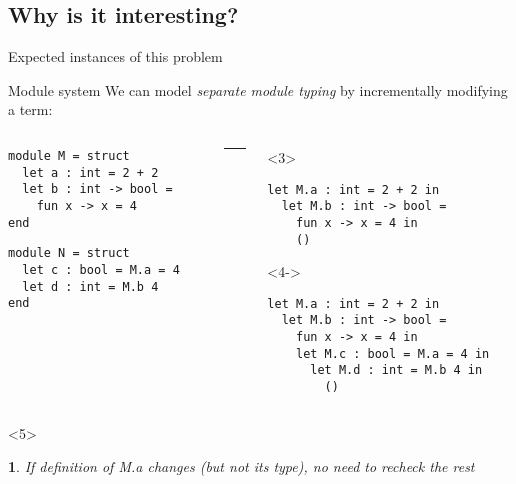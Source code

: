 \documentclass{beamer}
\theoremstyle{example}
\newtheorem{remark}[theorem]{\translate{Remark}}
\begin{document}
\subsection{Why is it interesting?}

\begin{frame}[fragile]{Expected instances of this problem}
  \begin{block}{Module system}
    We can model \emph{separate module typing} by incrementally
    modifying a term:

    \begin{overlayarea}{\textwidth}{13em}
    \small
    \begin{columns}
      \begin{column}{0.4\textwidth}
        \begin{lstlisting}
module M = struct
  let a : int = 2 + 2
  let b : int -> bool =
    fun x -> x = 4
end
        \end{lstlisting}
\pause
        \begin{lstlisting}
module N = struct
  let c : bool = M.a = 4
  let d : int = M.b 4
end
        \end{lstlisting}
      \end{column}
      \begin{column}{1mm}
        \rule{.1mm}{4cm}
      \end{column}
\pause
      \begin{column}{0.5\textwidth}
        \begin{onlyenv}<3>
        \begin{lstlisting}
let M.a : int = 2 + 2 in
  let M.b : int -> bool =
    fun x -> x = 4 in
    ()
        \end{lstlisting}
        \vspace{2.4em}
        \end{onlyenv}
        \begin{onlyenv}<4->
        \begin{lstlisting}
let M.a : int = 2 + 2 in
  let M.b : int -> bool =
    fun x -> x = 4 in
    let M.c : bool = M.a = 4 in
      let M.d : int = M.b 4 in
        ()
        \end{lstlisting}
        \end{onlyenv}
      \end{column}
    \end{columns}
    \end{overlayarea}
    \begin{visibleenv}<5>
      \begin{remark}
        If definition of \textsf{M.a} changes {\footnotesize (but not its type)}, no need to recheck the rest
      \end{remark}
    \end{visibleenv}
  \end{block}
\end{frame}
\end{document}
